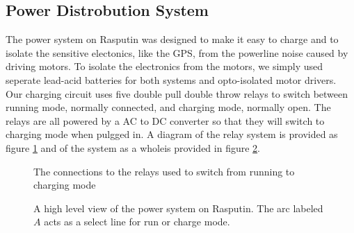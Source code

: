 \documentclass[master.tex]{subfiles}
\begin{document}
\subsection{Power Distrobution System}
The power system on Rasputin was designed to make it easy to charge and to isolate the sensitive electonics, like the GPS, from the powerline noise caused by driving motors.
To isolate the electronics from the motors, we simply used seperate lead-acid batteries for both systems and opto-isolated motor drivers.
Our charging circuit uses five double pull double throw relays to switch between running mode, normally connected, and charging mode, normally open.
The relays are all powered by a AC to DC converter so that they will switch to charging mode when pulgged in.
A diagram of the relay system is provided as figure \ref{relay-diagram} and of the system as a wholeis provided in figure \ref{power-distrobution-diagram}.
\begin{figure}
  
  \caption{The connections to the relays used to switch from running to charging mode}
  \label{relay-diagram}
\end{figure}
\begin{figure}
  
  \caption{A high level view of the power system on Rasputin.
    The arc labeled $A$ acts as a select line for run or charge mode. }
  \label{power-distrobution-diagram}
\end{figure}
\end{document}
